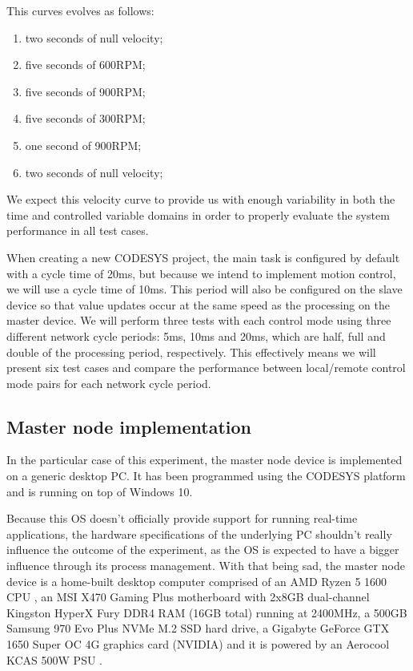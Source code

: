 This curves evolves as follows:
\begin{enumerate}
	\item two seconds of null velocity;
	\item five seconds of 600RPM;
	\item five seconds of 900RPM;
	\item five seconds of 300RPM;
	\item one second of 900RPM;
	\item two seconds of null velocity;
\end{enumerate}
We expect this velocity curve to provide us with enough variability in both the time and controlled variable domains in order to properly evaluate the system performance in all test cases.

When creating a new CODESYS project, the main task is configured by default with a cycle time of 20ms, but because we intend to implement motion control, we will use a cycle time of 10ms.
This period will also be configured on the slave device so that value updates occur at the same speed as the processing on the master device.
We will perform three tests with each control mode using three different network cycle periods: 5ms, 10ms and 20ms, which are half, full and double of the processing period, respectively.
This effectively means we will present six test cases and compare the performance between local/remote control mode pairs for each network cycle period.

\subsection{Master node implementation}
In the particular case of this experiment, the master node device is implemented on a generic desktop PC.
It has been programmed using the CODESYS platform and is running on top of Windows 10\texttrademark{}.

Because this OS doesn't officially provide support for running real-time applications, the hardware specifications of the underlying PC shouldn't really influence the outcome of the experiment, as the OS is expected to have a bigger influence through its process management.
With that being sad, the master node device is a home-built desktop computer comprised of an AMD Ryzen\texttrademark{} 5 1600 CPU \cite{hdw:ryzen5-1600}, an MSI X470 Gaming Plus \cite{hdw:msi-x470} motherboard with 2x8GB dual-channel Kingston HyperX Fury DDR4 RAM (16GB total) \cite{hdw:hyperx-fury-8gb-ddr4-2400} running at 2400MHz, a 500GB Samsung 970 Evo Plus NVMe\textregistered{} M.2 SSD \cite{hdw:970evo-plus-ssd} hard drive, a Gigabyte GeForce\textregistered{} GTX 1650 Super\texttrademark{} OC 4G \cite{hdw:gigabyte-1650-super-oc} graphics card (NVIDIA) and it is powered by an Aerocool KCAS 500W PSU \cite{hdw:kcas-500w}.

